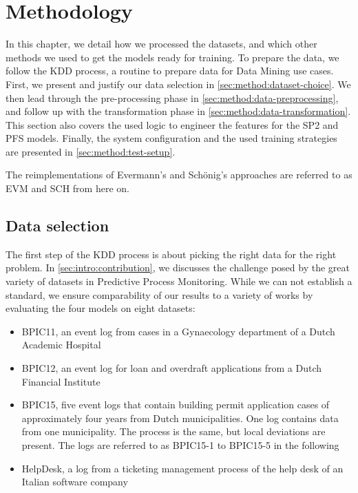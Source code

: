 \chapter{Methodology}\label{chap:methodology}
In this chapter, we detail how we processed the datasets, and which other methods we used to get the models ready for training.
To prepare the data, we follow the KDD process, a routine to prepare data for Data Mining use cases.
First, we present and justify our data selection in \autoref{sec:method:dataset-choice}.
We then lead through the pre-processing phase in \autoref{sec:method:data-preprocessing}, and follow up with the transformation phase in \autoref{sec:method:data-transformation}.
This section also covers the used logic to engineer the features for the SP2 and PFS models.
Finally, the system configuration and the used training strategies are presented in \autoref{sec:method:test-setup}.

The reimplementations of Evermann's and Schönig's approaches are referred to as EVM and SCH from here on.

\section{Data selection}\label{sec:method:dataset-choice}
The first step of the KDD process is about picking the right data for the right problem.
In \autoref{sec:intro:contribution}, we discusses the challenge posed by the great variety of datasets in Predictive Process Monitoring. While we can not establish a standard, we ensure comparability of our results to a variety of works by evaluating the four models on eight datasets:

\begin{itemize}
    \item BPIC11, an event log from cases in a Gynaecology department of a Dutch Academic Hospital~\cite{BPIC2011}
    \item BPIC12, an event log for loan and overdraft applications from a Dutch Financial Institute~\cite{BPIC2012}
    \item BPIC15, five event logs that contain building permit application cases of approximately four years from Dutch municipalities. One log contains data from one municipality. The process is the same, but local deviations are present. The logs are referred to as BPIC15-1 to BPIC15-5 in the following~\cite{BPIC2015}
    \item HelpDesk, a log from a ticketing management process of the help desk of an Italian software company~\cite{Helpdesk}
\end{itemize}


